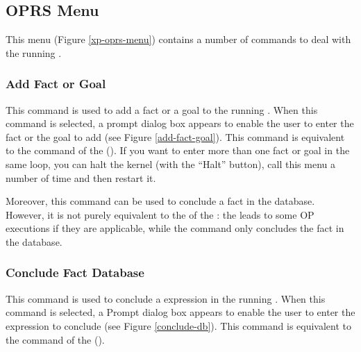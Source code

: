 \subsection{OPRS Menu}


This menu (Figure \ref{xp-oprs-menu}) contains a number of commands to deal with the running
\XPK{}.



\subsubsection{Add Fact or Goal}


This command is used to add a fact or a goal to the running \XPK{}.  When this
command is selected, a prompt dialog box appears to enable the user to enter
the fact or the goal to add (see Figure \ref{add-fact-goal}). This command is
equivalent to the  command of the \CPK{} (). If you want to enter more than one fact or
goal in the same \CPK{} loop, you can halt the kernel (with the ``Halt''
button), call this menu a number of time and then restart it.

Moreover, this command can be used to conclude a fact in the database.
However, it is not purely equivalent to the  of the \CPK{}: the  leads
to some OP executions if they are applicable, while the 
command only concludes the fact in the database.

\subsubsection{Conclude Fact Database}


This command is used to conclude a expression in the running \XPK{}.  When this
command is selected, a Prompt dialog box appears to enable the user to enter
the expression to conclude (see Figure \ref{conclude-db}). This command is
equivalent to the  command of the \CPK{}
().

